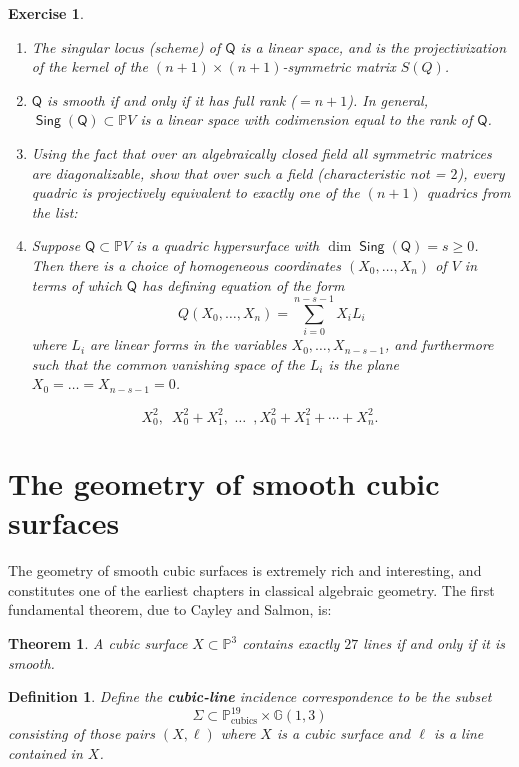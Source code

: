 \documentclass[11pt]{article}
\renewcommand{\P}{\mathbb{P}}
\newcommand{\G}{\mathbb{G}}
\DeclareMathOperator{\sing}{\mathsf{Sing}}
\DeclareMathOperator{\cubics}{\textrm{cubics}}
\renewcommand{\P}{\mathbb P}
\newcommand{\G}{\mathbb G}
\newtheorem{theorem}{Theorem}[section]
\newtheorem{definition}{Definition}[section]
\newtheorem{exercise}{Exercise}[section]
\begin{document}
\begin{exercise}
\begin{enumerate}
\item The singular locus (scheme) of \(\mathsf{Q}\) is a linear space, and is the projectivization of the kernel of the \((n+1)\times(n+1)\)-symmetric matrix \(S(Q)\).

\item \(\mathsf{Q}\) is smooth if and only if it has full rank (\(= n+1\)). In general, \(\sing(\mathsf{Q}) \subset \P V\) is a linear space with codimension equal to the rank of \(\mathsf{Q}\).

\item Using the fact that over an algebraically closed field all  symmetric matrices are diagonalizable, show that over such a field (characteristic not = \(2\)), every quadric is projectively equivalent to exactly one of the \((n+1)\) quadrics from the list:
\item Suppose \(\mathsf{Q} \subset \P V\) is a quadric hypersurface with \(\dim \sing(\mathsf{Q}) = s \geq 0\).  Then there is a choice of homogeneous coordinates \((X_0, \dots, X_{n})\) of \(V\) in terms of which \(\mathsf{Q}\) has defining equation of the form $$Q(X_0, \ldots, X_n) = \sum_{i = 0}^{n-s-1}X_{i}L_{i}$$ where \(L_{i}\) are linear forms in the variables \(X_0, \ldots, X_{n-s-1}\), and furthermore such that the common vanishing space of the \(L_{i}\) is the plane \(X_0 = \dots = X_{n-s-1}=0\).
\end{enumerate}
\[X_{0}^{2},\,\,\, X_{0}^2+X_{1}^2,\,\, \ldots\,\,\,, X_{0}^{2} + X_{1}^2 + \cdots +X_{n}^{2}.\]
\end{exercise}
\section{The geometry of smooth cubic surfaces}
\label{sec:orgd0ade9d}
The geometry of smooth cubic surfaces is extremely rich and interesting, and constitutes one of the earliest chapters  in classical algebraic geometry.  The first fundamental theorem, due to Cayley and Salmon, is: 

\begin{theorem}
A cubic surface \(X \subset \P^3\) contains exactly \(27\) lines if and only if it is smooth. 
\end{theorem}


\begin{definition}
Define the \textbf{\emph{cubic-line}} incidence correspondence to be the subset \[\Sigma \subset \P^{19}_{\cubics} \times \G(1,3)\] consisting of those pairs \((X,\ell)\) where \(X\) is a cubic surface and \(\ell\) is a line contained in \(X\).
\end{definition}
\end{document}
